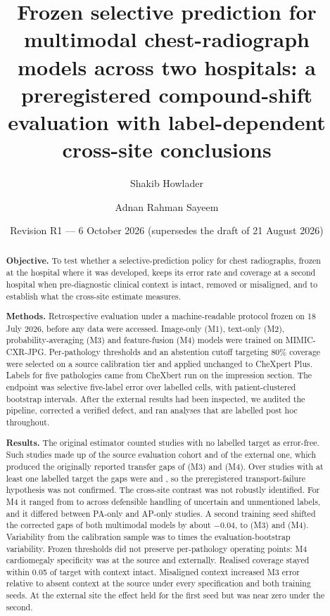 \documentclass[11pt,a4paper]{article}
\title{Frozen selective prediction for multimodal chest-radiograph models
across two hospitals: a preregistered compound-shift evaluation with
label-dependent cross-site conclusions}
\author{Shakib Howlader}
\author{Adnan Rahman Sayeem}
\affil{Daffodil International University}
\date{Revision R1 --- 6 October 2026 (supersedes the draft of 21 August 2026)}
\begin{document}
\maketitle

\begin{abstract}
\noindent\textbf{Objective.} To test whether a selective-prediction policy for
chest radiographs, frozen at the hospital where it was developed, keeps its
error rate and coverage at a second hospital when pre-diagnostic clinical
context is intact, removed or misaligned, and to establish what the cross-site
estimate measures.

\noindent\textbf{Methods.} Retrospective evaluation under a machine-readable
protocol frozen on 18 July 2026, before any data were accessed. Image-only (M1),
text-only (M2), probability-averaging (M3) and feature-fusion (M4) models were
trained on MIMIC-CXR-JPG. Per-pathology thresholds and an abstention cutoff
targeting 80\% coverage were selected on a source calibration tier and applied
unchanged to CheXpert Plus. Labels for five pathologies came from CheXbert run
on the impression section. The endpoint was selective five-label error over
labelled cells, with patient-clustered bootstrap intervals. After the external
results had been inspected, we audited the pipeline, corrected a verified
defect, and ran analyses that are labelled post hoc throughout.

\noindent\textbf{Results.} The original estimator counted studies with no
labelled target as error-free. Such studies made up \NoLabSrcImpression{} of
the source evaluation cohort and \NoLabExtImpression{} of the external one,
which produced the originally reported transfer gaps of \HOneMThreeOrigPt{} (M3) and
\HOneMFourOrigPt{} (M4). Over studies with at least one labelled target the
gaps were \HOneMThreeEval{} and \HOneMFourEval{}, so the preregistered
transport-failure hypothesis was not confirmed. The cross-site contrast was not
robustly identified. For M4 it ranged from \SensUncPosHOneMFourPt{} to
\SensUnmNegHOneMFourPt{} across defensible handling of uncertain and
unmentioned labels, and it differed between PA-only and AP-only studies. A
second training seed shifted the corrected gaps of both multimodal models by
about $-0.04$, to \SensSeedHOneMThreePt{} (M3) and \SensSeedHOneMFourPt{} (M4). Variability from the
calibration sample was \CalRatioMin{} to \CalRatioMax{} times the
evaluation-bootstrap variability. Frozen
thresholds did not preserve per-pathology operating points: M4 cardiomegaly
specificity was \MFourCardSpecSrc{} at the source and \MFourCardSpecExt{}
externally. Realised coverage stayed within 0.05 of target with context intact.
Misaligned context increased M3 error relative to absent context at the source
under every specification and both training seeds. At the external site the
effect held for the first seed but was near zero under the second.


\end{abstract}
\end{document}

